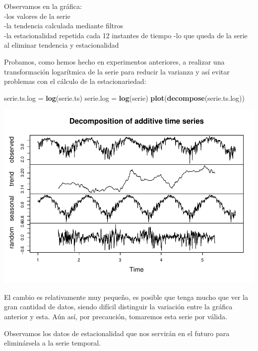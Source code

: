 \documentclass[]{article}
\newenvironment{Shaded}{\begin{snugshade}}{\end{snugshade}}
\newcommand{\KeywordTok}[1]{\textcolor[rgb]{0.13,0.29,0.53}{\textbf{#1}}}
\newcommand{\StringTok}[1]{\textcolor[rgb]{0.31,0.60,0.02}{#1}}
\newcommand{\OperatorTok}[1]{\textcolor[rgb]{0.81,0.36,0.00}{\textbf{#1}}}
\newcommand{\NormalTok}[1]{#1}
\begin{document}
Observamos en la gráfica:\\
-los valores de la serie\\
-la tendencia calculada mediante filtros\\
-la estacionalidad repetida cada 12 instantes de tiempo -lo que queda de
la serie al eliminar tendencia y estacionalidad

Probamos, como hemos hecho en experimentos anteriores, a realizar una
transformación logarítmica de la serie para reducir la varianza y así
evitar problemas con el cálculo de la estacionariedad:

\begin{Shaded}
\begin{Highlighting}[]
\NormalTok{serie.ts.log =}\StringTok{ }\KeywordTok{log}\NormalTok{(serie.ts) }
\NormalTok{serie.log =}\StringTok{ }\KeywordTok{log}\NormalTok{(serie) }
\KeywordTok{plot}\NormalTok{(}\KeywordTok{decompose}\NormalTok{(serie.ts.log))}
\end{Highlighting}
\end{Shaded}

\includegraphics{timeSeries_files/figure-latex/unnamed-chunk-40-1.pdf}

El cambio es relativamente muy pequeño, es posible que tenga mucho que
ver la gran cantidad de datos, siendo difícil distinguir la variación
entre la gráfica anterior y esta. Aún así, por precaución, tomaremos
esta serie por válida.

Observamos los datos de estacionalidad que nos servirán en el futuro
para eliminársela a la serie temporal.

\begin{Shaded}
\end{Shaded}
\end{document}
